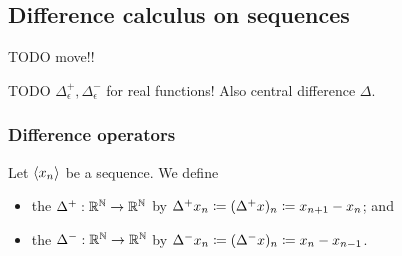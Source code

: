 \subsection{Difference calculus on sequences}
TODO move!!

TODO $\Delta^+_\epsilon, \Delta^-_\epsilon$ for real functions! Also central difference $\Delta$.
\subsubsection{Difference operators}
\begin{definition}
Let $\left\langle x_n \right\rangle$ be a sequence. We define
\begin{itemize}
\item the  $\Delta^+: \mathbb{R}^{\mathbb{N}} \to \mathbb{R}^{\mathbb{N}}$ by $\Delta^+ x_n \coloneqq (\Delta^+x)_n \coloneqq x_{n+1} - x_n$; and
\item the  $\Delta^-: \mathbb{R}^{\mathbb{N}} \to \mathbb{R}^{\mathbb{N}}$ by $\Delta^- x_n \coloneqq (\Delta^-x)_n \coloneqq x_{n} - x_{n-1}$.
\end{itemize}
\end{definition}
